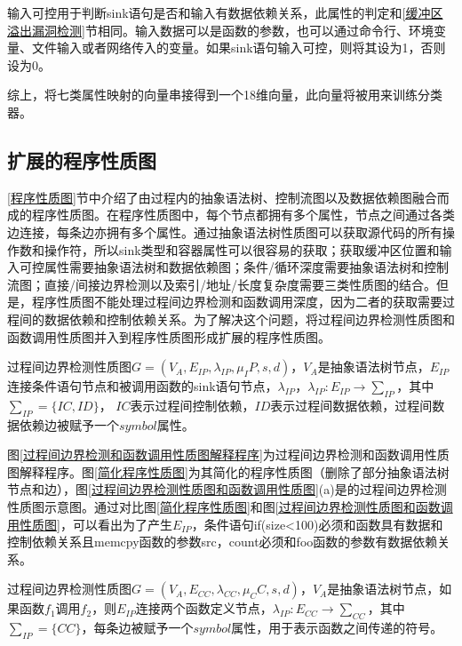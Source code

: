 {输入可控用于判断sink语句是否和输入有数据依赖关系，此属性的判定和\ref{缓冲区溢出漏洞检测}节相同。输入数据可以是函数的参数，也可以通过命令行、环境变量、文件输入或者网络传入的变量。如果sink语句输入可控，则将其设为1，否则设为0。

综上，将七类属性映射的向量串接得到一个18维向量，此向量将被用来训练分类器。

\subsection{扩展的程序性质图}
\label{扩展的程序性质图}

\ref{程序性质图}节中介绍了由过程内的抽象语法树、控制流图以及数据依赖图融合而成的程序性质图。在程序性质图中，每个节点都拥有多个属性，节点之间通过各类边连接，每条边亦拥有多个属性。通过抽象语法树性质图可以获取源代码的所有操作数和操作符，所以sink类型和容器属性可以很容易的获取；获取缓冲区位置和输入可控属性需要抽象语法树和数据依赖图；条件/循环深度需要抽象语法树和控制流图；直接/间接边界检测以及索引/地址/长度复杂度需要三类性质图的结合。但是，程序性质图不能处理过程间边界检测和函数调用深度，因为二者的获取需要过程间的数据依赖和控制依赖关系。为了解决这个问题，将过程间边界检测性质图和函数调用性质图并入到程序性质图形成扩展的程序性质图。

\begin{definition}
 \label{过程间边界检测程序性质图}
 过程间边界检测性质图$G=(V_A,E_{IP},\lambda_{IP} ,\mu_IP, s, d)$，$V_{A}$是抽象语法树节点，$E_{IP}$连接条件语句节点和被调用函数的sink语句节点，$\lambda_{IP}$，$\lambda_{IP}:E_{IP} \rightarrow \sum_{IP}$，其中$\sum_{IP}=\{IC, ID\}$， $IC$表示过程间控制依赖，$ID$表示过程间数据依赖，过程间数据依赖边被赋予一个$symbol$属性。
\end{definition}

图\ref{过程间边界检测和函数调用性质图解释程序}为过程间边界检测和函数调用性质图解释程序。图\ref{简化程序性质图}为其简化的程序性质图（删除了部分抽象语法树节点和边），图\ref{过程间边界检测性质图和函数调用性质图}(a)是的过程间边界检测性质图示意图。通过对比图\ref{简化程序性质图}和图\ref{过程间边界检测性质图和函数调用性质图}，可以看出为了产生$E_{IP}$，条件语句if(size<100)必须和函数具有数据和控制依赖关系且memcpy函数的参数src，count必须和foo函数的参数有数据依赖关系。

\begin{definition}
 \label{函数调用性质图}
 过程间边界检测性质图$G=(V_{A},E_{CC},\lambda_{CC} ,\mu_CC, s, d)$，$V_{A}$是抽象语法树节点，如果函数$f_1$调用$f_2$，则$E_{IP}$连接两个函数定义节点，$\lambda_{IP}:E_{CC} \rightarrow \sum_{CC}$，其中$\sum_{IP}=\{CC\}$，每条边被赋予一个$symbol$属性，用于表示函数之间传递的符号。
\end{definition}

}
